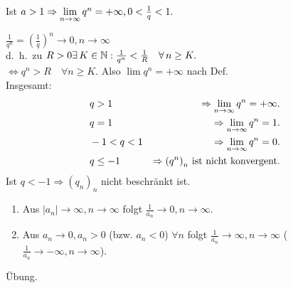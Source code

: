 \documentclass[../ana1.tex]{subfiles}
\begin{document}
\begin{bsp}
	Ist \(a>1 \Rightarrow \lim\limits_{n\rightarrow\infty}q^n = +\infty, 0< \frac{1}{q} < 1. \)
\end{bsp}
\begin{bew}
	\( \frac{1}{q^n} = {\left( \frac{1}{q} \right)}^n \rightarrow 0, n\rightarrow \infty \) \\
	d.\ h.\ zu \(R>0 \exists K\in\N: \frac{1}{q^n} < \frac{1}{R} \quad \forall n\geq K. \) \\
	\( \Leftrightarrow q^n > R \quad \forall n\geq K. \) Also \(\lim q^n = +\infty \) nach Def.\\
	Insgesamt: 
	\begin{align*}
		&q>1 &\Rightarrow \lim\limits_{n\rightarrow\infty}q^n = +\infty.\\
		&q=1 &\Rightarrow \lim\limits_{n\rightarrow\infty}q^n = 1.\\
		&-1<q<1 & \Rightarrow \lim\limits_{n\rightarrow\infty} q^n = 0.\\
		&q\leq -1 & \Rightarrow {(q^n)}_n \text{ ist nicht konvergent.}
	\end{align*}
	Ist \( q<-1 \Rightarrow {(q_n)}_n \) nicht beschränkt ist.
\end{bew}

\begin{satz}[Kehrwerte]\leavevmode
	\begin{enumerate}
		\item Aus \( |a_n| \rightarrow \infty, n\rightarrow\infty \) folgt \(\frac{1}{a_n} \rightarrow0,n\rightarrow\infty \).
		\item Aus \( a_n\rightarrow 0, a_n > 0 \) (bzw. \(a_n<0\)) \( \forall n \) folgt \( \frac{1}{a_n} \rightarrow\infty, n\rightarrow\infty \) (\( \frac{1}{a_n} \rightarrow -\infty, n\rightarrow\infty \)).
	\end{enumerate}
\end{satz}
\begin{bew}
	Übung.\phantom{\qedhere}
\end{bew}
\end{document}
